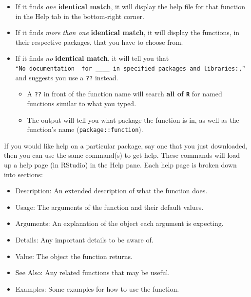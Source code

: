 \documentclass[
  10pt,
  letterpaper,
  twoside,
  openright]{book}
\providecommand{\tightlist}{%
  \setlength{\itemsep}{0pt}\setlength{\parskip}{0pt}}
\begin{document}
\begin{itemize}
\item
  If it finds \emph{one} \textbf{identical match}, it will display the
  help file for that function in the Help tab in the bottom-right
  corner.\\
\item
  If it finds \emph{more than one} \textbf{identical match}, it will
  display the functions, in their respective packages, that you have to
  choose from.\\
\item
  If it finds \emph{no} \textbf{identical match}, it will tell you that
  ``\texttt{No\ documentation\ \ for\ \_\_\_\_\ in\ specified\ packages\ and\ libraries:,}''
  and suggests you use a \texttt{??} instead.

  \begin{itemize}
  \tightlist
  \item
    A \texttt{??} in front of the function name will search \textbf{all
    of \texttt{R}} for named functions similar to what you typed.\\
  \item
    The output will tell you what package the function is in, as well as
    the function's name (\texttt{package::function}).
  \end{itemize}
\end{itemize}

If you would like help on a particular package, say one that you just
downloaded, then you can use the same command(s) to get help. These
commands will load up a help page (in RStudio) in the Help pane. Each
help page is broken down into sections:

\begin{itemize}
\tightlist
\item
  Description: An extended description of what the function does.\\
\item
  Usage: The arguments of the function and their default values.\\
\item
  Arguments: An explanation of the object each argument is expecting.\\
\item
  Details: Any important details to be aware of.\\
\item
  Value: The object the function returns.\\
\item
  See Also: Any related functions that may be useful.\\
\item
  Examples: Some examples for how to use the function.
\end{itemize}
\end{document}
